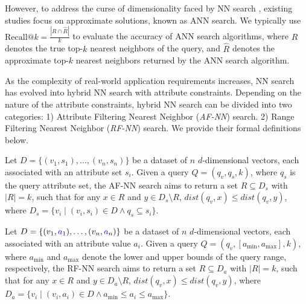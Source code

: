 \documentclass[sigconf, nonacm]{acmart}
\begin{document}
{	However, to address the curse of dimensionality faced by NN search \cite{dimcurse}, existing studies focus on approximate solutions, known as ANN  search. We typically use $\text{Recall}@k = \frac{|R \cap \hat{R}|}{k}$ to evaluate the accuracy of ANN search algorithms, where $R$ denotes the true top-$k$ nearest neighbors of the query, and $\hat{R}$ denotes the approximate top-$k$ nearest neighbors returned by the ANN search algorithm.
	
	As the complexity of real-world application requirements increases, NN search has evolved into hybrid NN search with attribute constraints. Depending on the nature of the attribute constraints, hybrid NN search can be divided into two categories: 1) Attribute Filtering Nearest Neighbor (\textit{AF-NN}) search. 2) Range Filtering Nearest Neighbor (\textit{RF-NN}) search. We provide their formal definitions below.
	
	\begin{definition}[AF-NN Search]
		Let \( D = \{(v_1, s_1), \ldots, (v_n, s_n)\} \) be a dataset of \( n \) \( d \)-dimensional vectors, each associated with an attribute set \( s_i \). Given a query \( Q = (q_v, q_s, k) \), where \( q_s \) is the query attribute set, the AF-NN search aims to return a set \( R \subseteq D_s \) with \( |R| = k \), such that for any \( x \in R \) and \( y \in D_s \setminus R \), \( \textit{dist}(q_v, x) \leq \textit{dist}(q_v, y) \), where \( D_s = \{ v_i \mid (v_i, s_i) \in D \land q_s \subseteq s_i \} \).
	\end{definition}
	
	
	\begin{definition}[RF-NN Search]
		
		Let \( D = \{(v_1, \textcolor{blue}{a}_1), \ldots, (v_n, \textcolor{blue}{a}_n)\} \) be a dataset of \( n \) \( d \)-dimensional vectors, each associated with an attribute value \( a_i \). Given a query \( Q = (q_v, [a_{\min}, a_{\max}], k) \), where \( a_{\min} \) and \( a_{\max} \) denote the lower and upper bounds of the query range, respectively, the RF-NN search aims to return a set \( R \subseteq D_a \) with \( |R| = k \), such that for any \( x \in R \) and \( y \in D_a \setminus R \), \( \textit{dist}(q_v, x) \leq \textit{dist}(q_v, y) \), where \( D_a = \{ v_i \mid (v_i, a_i) \in D \land a_{\min} \leq a_i \leq a_{\max} \} \).
	\end{definition}
	
}
\end{document}
